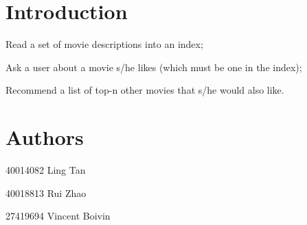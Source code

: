 \hypertarget{index_Introduction}{}\section{Introduction}\label{index_Introduction}

\begin{DoxyEnumerate}
\item Read a set of movie descriptions into an index;
\item Ask a user about a movie s/he likes (which must be one in the index);
\item Recommend a list of top-\/n other movies that s/he would also like.
\end{DoxyEnumerate}\hypertarget{index_Authors}{}\section{Authors}\label{index_Authors}
40014082 Ling Tan \par
 40018813 Rui Zhao \par
 27419694 Vincent Boivin 